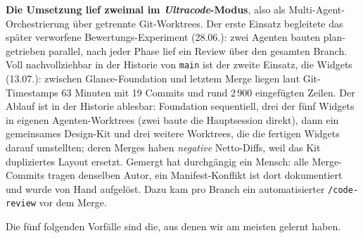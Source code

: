 \documentclass{msereport}
\begin{document}
\textbf{Die Umsetzung lief zweimal im \emph{Ultracode}-Modus}, also als
Multi-Agent-Orchestrierung über getrennte Git-Worktrees. Der erste Einsatz
begleitete das später verworfene Bewertungs-Experiment (28.06.): zwei Agenten
bauten plan-getrieben parallel, nach jeder Phase lief ein Review über den
gesamten Branch. Voll nachvollziehbar in der Historie von \texttt{main} ist der
zweite Einsatz, die Widgets (13.07.): zwischen Glance-Foundation und letztem Merge
liegen laut Git-Timestamps 63 Minuten mit 19 Commits und rund 2\,900
eingefügten Zeilen. Der Ablauf ist in der Historie ablesbar: Foundation
sequentiell, drei der fünf Widgets in eigenen Agenten-Worktrees (zwei baute die
Hauptsession direkt), dann ein gemeinsames Design-Kit und drei weitere
Worktrees, die die fertigen Widgets darauf umstellten; deren Merges haben
\emph{negative} Netto-Diffs, weil das Kit dupliziertes Layout ersetzt. Gemergt
hat durchgängig ein Mensch: alle Merge-Commits tragen denselben Autor, ein
Manifest-Konflikt ist dort dokumentiert und wurde von Hand aufgelöst. Dazu kam
pro Branch ein automatisierter \texttt{/code-review} vor dem Merge.

Die fünf folgenden Vorfälle sind die, aus denen wir am meisten gelernt haben.

\msevspace{6pt}\mseblank
\end{document}
